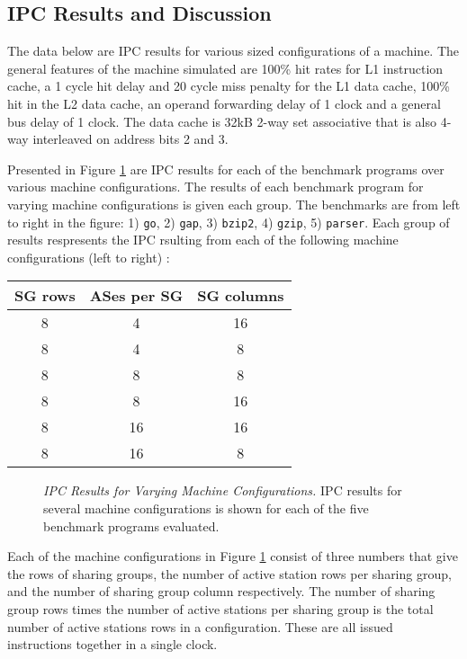 \documentclass[10pt,dvips]{article}
\begin{document}
\subsection{IPC Results and Discussion}
%
The data below are IPC results for various sized configurations of
a machine.  The general features of
the machine simulated are 100\% hit rates for L1 instruction cache,
a 1 cycle hit delay and 20 cycle miss penalty for the L1 data cache,
100\% hit in the L2 data cache, an operand forwarding delay of 1 clock
and a general bus delay of 1 clock.  The data cache is 32kB 2-way
set associative that is also 4-way interleaved on address bits 2 and 3.

Presented in 
Figure \ref{fig:ipc} are IPC results for each of the benchmark
programs over various machine configurations.
The results of each benchmark program for varying machine
configurations is given each group.  The benchmarks are from left to
right in the figure: 1) {\tt go}, 2) {\tt gap}, 3) {\tt bzip2},
4) {\tt gzip}, 5) {\tt parser}.  Each group of results respresents
the IPC rsulting from each of the following machine configurations (left
to right) :

\begin{tabular}{|c|c|c|}
\hline 
SG rows&
ASes per SG&
SG columns\\
\hline
\hline 
8&
4&
16\\
\hline 
8&
4&
8\\
\hline 
8&
8&
8\\
\hline 
8&
8&
16\\
\hline 
8&
16&
16\\
\hline 
8&
16&
8\\
\hline
\end{tabular}

\begin{figure}[h]
\centering
{}
\caption{{\em IPC Results for Varying Machine Configurations.} 
IPC results for several machine configurations is shown for each of
the five benchmark programs evaluated.}
\label{fig:ipc}
\end{figure}

Each of the machine configurations in Figure \ref{fig:ipc} consist of
three numbers that give the rows of sharing groups, the number of
active station rows per sharing group, and the number of sharing group
column respectively.  The number of sharing group rows times the number
of active stations per sharing group is the total number of active
stations rows in a configuration.  These are all issued instructions
together in a single clock.
\end{document}

